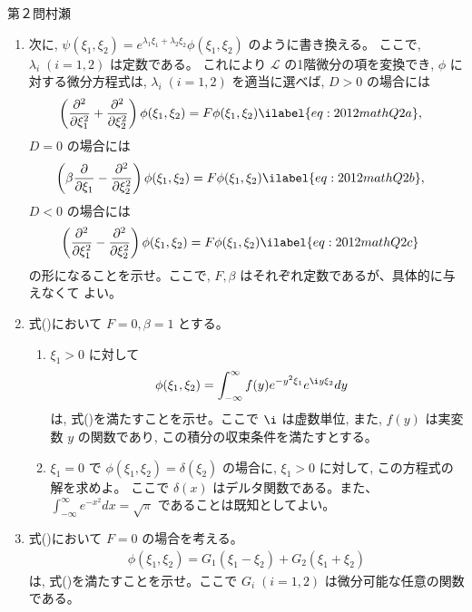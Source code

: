\begin{question}{第２問}{村瀬}
\begin{enumerate}
\item
  次に, $\psi(\xi_1,\xi_2) = e^{\lambda_1\xi_1+\lambda_2\xi_2} \phi(\xi_1,\xi_2)$ のように書き換える。
  ここで, $\lambda_i \; (i=1,2)$ は定数である。
  これにより $\mathcal{L}$ の1階微分の項を変換でき, 
  $\phi$ に対する微分方程式は, $\lambda_i\;(i=1,2)$
  を適当に選べば, $D>0$ の場合には
  \begin{align}
    \left(\dfrac{\partial^2}{\partial\xi_1^2}
      + \dfrac{\partial^2}{\partial\xi_2^2}\right)
    \phi(\xi_1,\xi_2) &= F\phi(\xi_1,\xi_2) \ilabel{eq:2012mathQ2a},
  \end{align}
  $D=0$ の場合には
  \begin{align}
    \left(\beta \dfrac{\partial}{\partial\xi_1}
      - \dfrac{\partial^2}{\partial\xi_2^2}\right)
    \phi(\xi_1,\xi_2) &= F\phi(\xi_1,\xi_2) \ilabel{eq:2012mathQ2b},
  \end{align}
  $D<0$ の場合には
  \begin{align}
    \left(\frac{\partial^2}{\partial\xi_1^2}
      - \frac{\partial^2}{\partial\xi_2^2} \right)
    \phi(\xi_1,\xi_2) &= F\phi(\xi_1,\xi_2) \ilabel{eq:2012mathQ2c}
  \end{align}
  の形になることを示せ。ここで, $F, \beta$ はそれぞれ定数であるが、具体的に与えなくて
  よい。

\item
  式()において $F=0, \beta=1$ とする。
  \begin{enumerate}
  \item $\xi_1>0$ に対して
    \begin{align*}
      \phi(\xi_1,\xi_2) &= \int_{-\infty}^\infty f(y) e^{-y^2\xi_1} e^{\i y \xi_2} dy
    \end{align*}
    は, 式()を満たすことを示せ。ここで $\i$ は虚数単位,
    また, $f(y)$ は実変数 $y$ の関数であり, この積分の収束条件を満たすとする。
  \item
    $\xi_1=0$ で $\phi(\xi_1,\xi_2)=\delta(\xi_2)$ の場合に,
    $\xi_1>0$ に対して, この方程式の解を求めよ。
    ここで $\delta(x)$ はデルタ関数である。また、
    $\displaystyle \int_{-\infty}^\infty e^{-x^2} dx = \sqrt{\pi}$ であることは既知としてよい。
  \end{enumerate}

\item
  式()において $F=0$ の場合を考える。
  \begin{align*}
    \phi(\xi_1,\xi_2)=G_1(\xi_1-\xi_2)+G_2(\xi_1+\xi_2)
  \end{align*}
  は, 式()を満たすことを示せ。ここで $G_i\; (i=1, 2)$ は微分可能な任意の関数である。

\end{enumerate}
\end{question}
